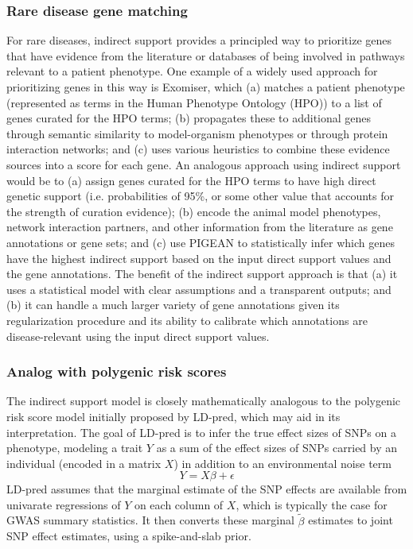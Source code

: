 \documentclass[11pt]{article}
\begin{document}
\subsubsection{Rare disease gene matching}
For rare diseases, indirect support provides a principled way to
prioritize genes that have evidence from the literature or databases
of being involved in pathways relevant to a patient phenotype. One
example of a widely used approach for prioritizing genes in this way
is Exomiser, which (a) matches a patient phenotype (represented as
terms in the Human Phenotype Ontology (HPO)) to a list of genes curated
for the HPO terms; (b) propagates these to additional genes through
semantic similarity to model-organism phenotypes or through protein
interaction networks; and (c) uses various heuristics to combine these
evidence sources into a score for each gene. An analogous approach
using indirect support would be to (a) assign genes curated for the
HPO terms to have high direct genetic support (i.e. probabilities of
95\%, or some other value that accounts for the strength of curation
evidence); (b) encode the animal model phenotypes, network interaction
partners, and other information from the literature as gene
annotations or gene sets; and (c) use PIGEAN to statistically infer
which genes have the highest indirect support based on the input
direct support values and the gene annotations. The benefit of the
indirect support approach is that (a) it uses a statistical model with
clear assumptions and a transparent outputs; and (b) it can handle a
much larger variety of gene annotations given its regularization
procedure and its ability to calibrate which annotations are
disease-relevant using the input direct support values.

\subsubsection{Analog with polygenic risk scores}
The indirect support model is closely mathematically analogous to the
polygenic risk score model initially proposed by
LD-pred\cite{analogous}, which may aid in its interpretation. The goal
of LD-pred is to infer the true effect sizes of SNPs on a phenotype,
modeling a trait $Y$ as a sum of the effect sizes of SNPs carried by
an individual (encoded in a matrix $X$) in addition to an environmental noise term
\[Y = X\beta + \epsilon\]
LD-pred assumes that the marginal estimate of the SNP effects are
available from univarate regressions of $Y$ on each column of $X$,
which is typically the case for GWAS summary statistics. It then
converts these marginal $\tilde{\beta}$ estimates to joint SNP effect
estimates, using a spike-and-slab prior.
\end{document}
